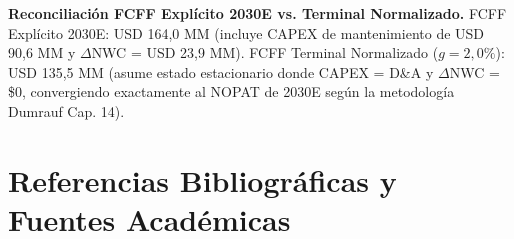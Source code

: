 \documentclass[10pt,a4paper]{article}
\begin{document}
\noindent
{\small \textbf{Reconciliación FCFF Explícito 2030E vs. Terminal Normalizado.} FCFF Explícito 2030E: USD 164,0 MM (incluye CAPEX de mantenimiento de USD 90,6 MM y $\Delta$NWC = USD 23,9 MM). FCFF Terminal Normalizado ($g = 2,0\%$): USD 135,5 MM (asume estado estacionario donde CAPEX = D\&A y $\Delta$NWC = \$0, convergiendo exactamente al NOPAT de 2030E según la metodología Dumrauf Cap. 14).\par}

\clearpage

\section*{Referencias Bibliográficas y Fuentes Académicas}
\end{document}

